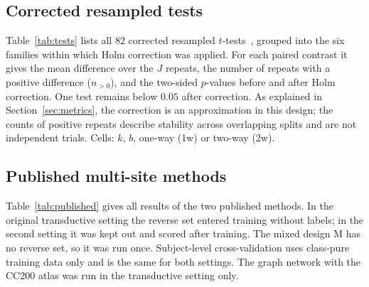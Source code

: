 \subsection{Corrected resampled tests}

Table~\ref{tab:tests} lists all $82$ corrected resampled $t$-tests~\cite{nadeau2003}, grouped into the six families within which Holm correction was applied. For each paired contrast it gives the mean difference over the $J$ repeats, the number of repeats with a positive difference ($n_{>0}$), and the two-sided $p$-values before and after Holm correction. One test remains below $0.05$ after correction. As explained in Section~\ref{sec:metrics}, the correction is an approximation in this design; the counts of positive repeats describe stability across overlapping splits and are not independent trials. Cells: $k$, $b$, one-way (1w) or two-way (2w).

{\footnotesize\setlength{\tabcolsep}{2.5pt}

}

\subsection{Published multi-site methods}

Table~\ref{tab:published} gives all results of the two published methods. In the original transductive setting the reverse set entered training without labels; in the second setting it was kept out and scored after training. The mixed design M has no reverse set, so it was run once. Subject-level cross-validation uses class-pure training data only and is the same for both settings. The graph network with the CC200 atlas was run in the transductive setting only.

